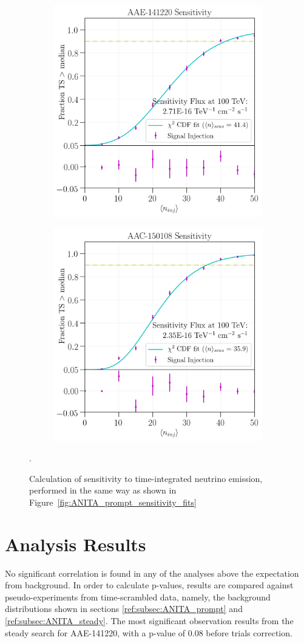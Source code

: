 \begin{figure}
\centering
\begin{subfigure}
  \centering
  \includegraphics[width=.48\linewidth]{figures/ANITA/Steady/AAE-141220_sensitivity_fits.png}
  \label{fig:ANITA_steady_sensitivity_fits_aae}
\end{subfigure}%
\begin{subfigure}
  \centering
  \includegraphics[width=.48\linewidth]{figures/ANITA/Steady/AAC-150108_sensitivity_fits.png}
  \label{fig:ANITA_steady_sensitivity_fits_aac}
\end{subfigure}
\caption[ANITA Steady sensitivity calculation]{Calculation of sensitivity to time-integrated neutrino emission, performed in the same way as shown in Figure~\ref{fig:ANITA_prompt_sensitivity_fits}}.
\label{fig:ANITA_steady_sensitivity}
\end{figure}

\section{Analysis Results}
\label{sec:ANITA_results}
No significant correlation is found in any of the analyses above the expectation from background. In order to calculate p-values, results are compared against pseudo-experiments from time-scrambled data, namely, the background distributions shown in sections \ref{ref:subsec:ANITA_prompt} and \ref{ref:subsec:ANITA_steady}. The most significant observation results from the steady search for AAE-141220, with a p-value of 0.08 before trials correction.

